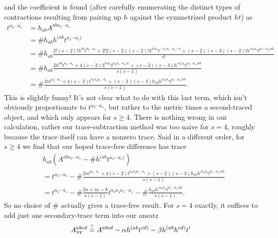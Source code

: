 \documentclass[11pt,letterpaper]{article}
\newcommand{\LP}{\left(}
\newcommand{\RP}{\right)}
\begin{document}
and the coefficient is found (after carefully enumerating the distinct types of contractions resulting from pairing up $h$ against the symmetrized product $ht$) as \begin{equation}
\begin{aligned}
t^{a_3 \cdots a_s} & = h_{ab} A^{ab a_3 \cdots a_s} \\
& = \# h_{ab} h^{(a b} t^{a_3 \cdots a_s)} \\
& = \# h_{ab} \frac{2! (s-2)! h^{ab} t^{a_3 \cdots a_s} +  2! 2(s-2)(s-2)! h^{b( a_3} t^{(a_4 a_5 \cdots a_s) a} + (s-2)(s-3) (s-2)!h^{(a_3 a_4} t^{a_5 \cdots a_s) a b}}{s!} \\
& = \# h_{ab} \frac{2 h^{ab} t^{a_3 \cdots a_s} +  4(s-2) h^{b (a_3} t^{a_4 a_5 \cdots a_s) a} + (s-2)(s-3) h^{(a_3 a_4} t^{a_5 \cdots a_s) a b}}{s(s-1)} \\
& = \# \frac{2 n t^{a_3 \cdots a_s} +  4 (s-2) t^{a_3 a_4 a_5 \cdots a_s} + (s-2)(s-3) h_{ab}  h^{(a_3 a_4} t^{a_5 \cdots a_s) a b} }{s(s-1)}.
\end{aligned}
\end{equation}
This is slightly funny! It's not clear what to do with this last term, which isn't obviously proportionate to $t^{a_3 \cdots a_s}$, but rather to the metric times a second-traced object, and which only appears for $s \geq 4$. There is nothing wrong in our calculation, rather our trace-subtraction method was too naive for $s = 4$, roughly because the trace itself can have a nonzero trace. Said in a different order, for $s \geq 4$ we find that our hoped trace-free difference has trace \begin{equation}
\begin{aligned}
& h_{ab} \LP A^{a b a_3 \cdots a_s} - \# h^{(ab} t^{a_3 \cdots a_s)} \RP \\
& = t^{a_3 \cdots a_s} - \# \frac{2 n t^{a_3 \cdots a_s} +  4 (s-2) t^{a_3 a_4 a_5 \cdots a_s} + (s-2)(s-3) h_{ab}  h^{(a_3 a_4} t^{a_5 \cdots a_s) a b} }{s(s-1)} \\
& = t^{a_3 \cdots a_s} - \# \frac{2 n  +  4 s - 8}{s(s-1)}t^{a_3 a_4 a_5 \cdots a_s}  - \# \frac{h_{ab}  h^{(a_3 a_4} t^{a_5 \cdots a_s) a b} }{s(s-1)}.
\end{aligned}
\end{equation}
So no choice of $\#$ actually gives a trace-free result. For $s = 4$ exactly, it suffices to add just one secondary-trace term into our ansatz \begin{equation}
A_{\mbox{\tiny{TF}}}^{a b c d} \stackrel{?}{=} A^{abcd} - \alpha h^{(ab} t^{cd)} - \beta h^{(ab} h^{cd)} t'
\end{equation}
\end{document}
